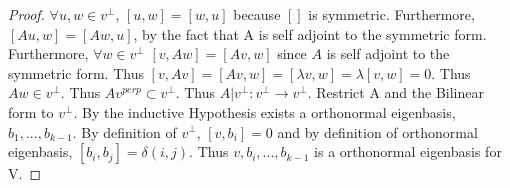 \documentclass{article}
\begin{document}
\begin{proof}
    
    $\forall u, w \in v^\perp$, $[u, w] = [w, u]$ because $[]$ is symmetric. Furthermore, $[Au, w] = [Aw, u]$, by the fact that A is self adjoint to the symmetric form. Furthermore, $\forall w \in v^\perp$  $[v, Aw] = [Av, w]$ since $A$ is self adjoint to the symmetric form. Thus $[v, Av] = [Av, w] = [\lambda v, w] = \lambda [v, w] = 0$. Thus $Aw \in v^\perp$. Thus $Av^{perp} \subset v^\perp$. Thus $A|v^\perp : v^\perp \to v^\perp$. Restrict A and the Bilinear form to $v^\perp$. By the inductive Hypothesis exists a orthonormal eigenbasis, $b_1, ..., b_{k-1}$. By definition of $v^\perp$, $[v, b_i] = 0$ and by definition of orthonormal eigenbasis, $[b_i, b_j] = \delta(i, j)$. Thus $v, b_i, ..., b_{k - 1}$ is a orthonormal eigenbasis for V.                 
\end{proof}

\bigskip
\end{document}
